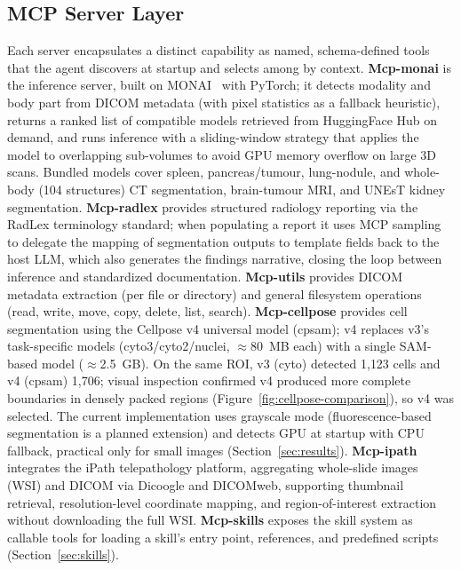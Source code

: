 \documentclass[conference]{IEEEtran}
\begin{document}
\subsection{MCP Server Layer}
Each server encapsulates a distinct capability as named, schema-defined tools that the agent discovers at startup and selects among by context. \textbf{Mcp-monai} is the inference server, built on MONAI~\cite{monai} with PyTorch; it detects modality and body part from DICOM metadata (with pixel statistics as a fallback heuristic), returns a ranked list of compatible models retrieved from HuggingFace Hub on demand, and runs inference with a sliding-window strategy that applies the model to overlapping sub-volumes to avoid GPU memory overflow on large 3D scans. Bundled models cover spleen, pancreas/tumour, lung-nodule, and whole-body (104 structures) CT segmentation, brain-tumour MRI, and UNEsT kidney segmentation. \textbf{Mcp-radlex} provides structured radiology reporting via the RadLex terminology standard; when populating a report it uses MCP sampling to delegate the mapping of segmentation outputs to template fields back to the host LLM, which also generates the findings narrative, closing the loop between inference and standardized documentation. \textbf{Mcp-utils} provides DICOM metadata extraction (per file or directory) and general filesystem operations (read, write, move, copy, delete, list, search). \textbf{Mcp-cellpose} provides cell segmentation using the Cellpose v4 universal model (cpsam); v4 replaces v3's task-specific models (cyto3/cyto2/nuclei, $\approx$80~MB each) with a single SAM-based model ($\approx$2.5~GB). On the same ROI, v3 (cyto) detected 1{,}123 cells and v4 (cpsam) 1{,}706; visual inspection confirmed v4 produced more complete boundaries in densely packed regions (Figure~\ref{fig:cellpose-comparison}), so v4 was selected. The current implementation uses grayscale mode (fluorescence-based segmentation is a planned extension) and detects GPU at startup with CPU fallback, practical only for small images (Section~\ref{sec:results}). \textbf{Mcp-ipath} integrates the iPath telepathology platform, aggregating whole-slide images (WSI) and DICOM via Dicoogle and DICOMweb, supporting thumbnail retrieval, resolution-level coordinate mapping, and region-of-interest extraction without downloading the full WSI. \textbf{Mcp-skills} exposes the skill system as callable tools for loading a skill's entry point, references, and predefined scripts (Section~\ref{sec:skills}).
\end{document}
